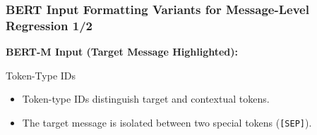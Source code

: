 \documentclass[aspectratio=169]{beamer}
\begin{document}
\begin{frame}
  \frametitle{BERT Input Formatting Variants for Message-Level Regression 1/2}
  \small
    \textbf{BERT-M Input (Target Message Highlighted):}
    \begin{center}
    \end{center}
    
    \vspace{0.3cm}
    \begin{block}{Token-Type IDs}
      \begin{itemize}
        \item Token-type IDs distinguish target and contextual tokens.
        \item The target message is isolated between two special tokens (\texttt{[SEP]}).
      \end{itemize}
    \end{block}
\end{frame}
\end{document}
